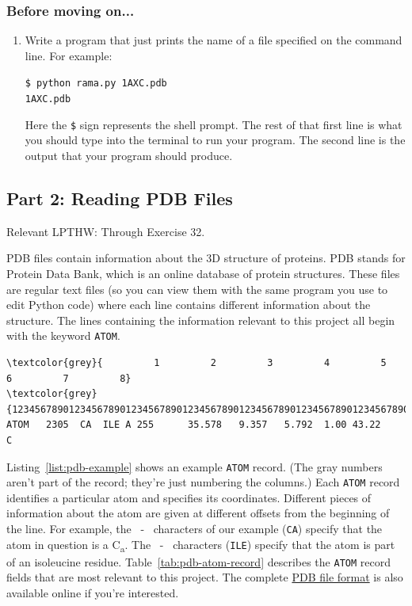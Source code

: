 \documentclass{article}
\newcommand{\calpha}{C\textsubscript{\textgreek{a}}}
\newcommand{\atomrec}{\texttt{ATOM} record}
\newenvironment{lpthw}
{Relevant LPTHW:}
{}
\newenvironment{problems}
{\subsubsection{Before moving on...} \begin{enumerate}}
{\end{enumerate}}
\begin{document}
\begin{problems}
 \item Write a program that just prints the name of a file specified on the 
  command line.  For example:

  \texttt{\$ python rama.py 1AXC.pdb \\ 1AXC.pdb}

  Here the \texttt{\$} sign represents the shell prompt.  The rest of that 
  first line is what you should type into the terminal to run your program.  
  The second line is the output that your program should produce.
\end{problems}

\subsection{Part 2: Reading PDB Files}

\begin{lpthw}
Through Exercise 32.
\end{lpthw}

PDB files contain information about the 3D structure of proteins.  PDB stands 
for Protein Data Bank, which is an online database of protein structures.  
These files are regular text files (so you can view them with the same program 
you use to edit Python code) where each line contains different information 
about the structure.  The lines containing the information relevant to this 
project all begin with the keyword \texttt{ATOM}.  

\begin{listing}[h]
\centering
\begin{BVerbatim}[fontsize=\footnotesize,commandchars=\\\{\}]
\textcolor{grey}{         1         2         3         4         5         6         7         8}
\textcolor{grey}{12345678901234567890123456789012345678901234567890123456789012345678901234567890}
ATOM   2305  CA  ILE A 255      35.578   9.357   5.792  1.00 43.22           C  
\end{BVerbatim}
\caption{An example \atomrec{}.}
\label{list:pdb-example}
\end{listing}

Listing~\ref{list:pdb-example} shows an example \atomrec{}.  (The gray numbers 
aren't part of the record; they're just numbering the columns.)  Each 
\atomrec{} identifies a particular atom and specifies its coordinates.  
Different pieces of information about the atom are given at different offsets 
from the beginning of the line.  For example, the ~-~ 
characters of our example (\texttt{CA}) specify that the atom in question is a 
\calpha{}.  The ~-~ characters (\texttt{ILE}) specify that the 
atom is part of an isoleucine residue.
Table~\ref{tab:pdb-atom-record} describes the \atomrec{} fields that are most 
relevant to this project.  The complete 
\href{http://www.wwpdb.org/documentation/format33/v3.3.html}{PDB file format} 
is also available online if you're interested.
\end{document}
